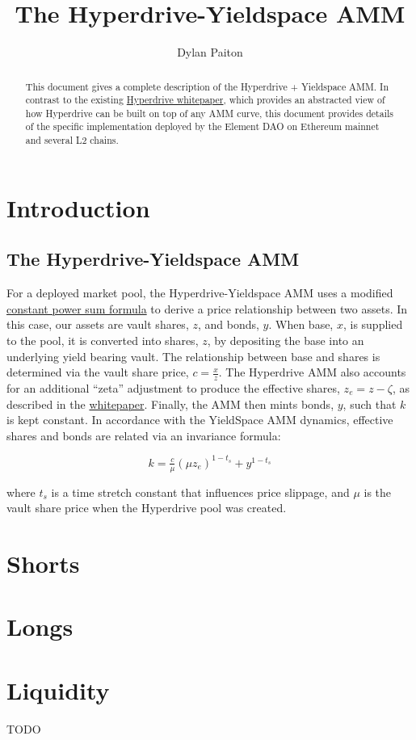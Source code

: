 \documentclass{article}
\title{The Hyperdrive-Yieldspace AMM}
\author{Dylan Paiton}
\begin{document}
\maketitle


\begin{abstract}
This document gives a complete description of the Hyperdrive + Yieldspace AMM.
In contrast to the existing \href{https://github.com/delvtech/hyperdrive/blob/main/docs/Hyperdrive_Whitepaper.pdf}{Hyperdrive whitepaper}, which provides an abstracted view of how Hyperdrive can be built on top of any AMM curve, this document provides details of the specific implementation deployed by the Element DAO on Ethereum mainnet and several L2 chains.
\end{abstract}

\section{Introduction}

\subsection{The Hyperdrive-Yieldspace AMM}

For a deployed market pool, the Hyperdrive-Yieldspace AMM uses a modified \href{https://yield.is/YieldSpace.pdf}{constant power sum formula} to derive a price relationship between two assets.
In this case, our assets are vault shares, $z$, and bonds, $y$.
When base, $x$, is supplied to the pool, it is converted into shares, $z$, by depositing the base into an underlying yield bearing vault.
The relationship between base and shares is determined via the vault share price, $c = \tfrac{x}{z}$.
The Hyperdrive AMM also accounts for an additional ``zeta'' adjustment to produce the effective shares, $z_e = z - \zeta$, as described in the \href{https://github.com/delvtech/hyperdrive/blob/main/docs/Hyperdrive_Whitepaper.pdf}{whitepaper}.
Finally, the AMM then mints bonds, $y$, such that $k$ is kept constant.
In accordance with the YieldSpace AMM dynamics, effective shares and bonds are related via an invariance formula:

\begin{equation}\label{keq}
k = \tfrac{c}{\mu} (\mu z_e)^{1 - t_{s}} + y^{1 - t_{s}}
\end{equation}

where $t_{s}$ is a time stretch constant that influences price slippage, and $\mu$ is the vault share price when the Hyperdrive pool was created.

\section{Shorts}


\section{Longs}


\section{Liquidity}
TODO
\end{document}
